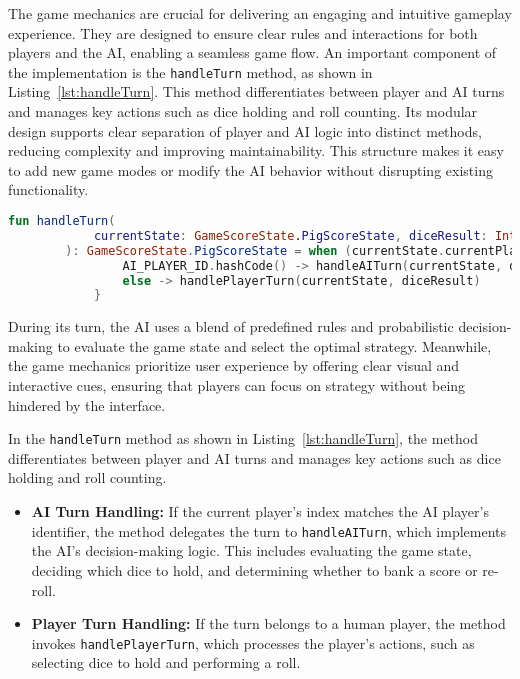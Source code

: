 The game mechanics are crucial for delivering an engaging and intuitive gameplay experience. They are designed to ensure clear rules and interactions for both players and the AI, enabling a seamless game flow.
An important component of the implementation is the \texttt{handleTurn} method, as shown in Listing~\ref{lst:handleTurn}. This method differentiates between player and AI turns and manages key actions such as dice holding and roll counting. Its modular design supports clear separation of player and AI logic into distinct methods, reducing complexity and improving maintainability. This structure makes it easy to add new game modes or modify the AI behavior without disrupting existing functionality.

\begin{lstlisting}[language=Kotlin, caption={handleTurn Function}, label=lst:handleTurn]
    fun handleTurn(
            currentState: GameScoreState.PigScoreState, diceResult: Int? = null
        ): GameScoreState.PigScoreState = when (currentState.currentPlayerIndex) {
                AI_PLAYER_ID.hashCode() -> handleAITurn(currentState, diceResult)
                else -> handlePlayerTurn(currentState, diceResult)
            }
\end{lstlisting}

During its turn, the AI uses a blend of predefined rules and probabilistic decision-making to evaluate the game state and select the optimal strategy. Meanwhile, the game mechanics prioritize user experience by offering clear visual and interactive cues, ensuring that players can focus on strategy without being hindered by the interface.

In the \texttt{handleTurn} method as shown in Listing~\ref{lst:handleTurn}, the method differentiates between player and AI turns and manages key actions such as dice holding and roll counting.
\begin{itemize}
    \item \textbf{AI Turn Handling:} If the current player's index matches the AI player's identifier, the method delegates the turn to \texttt{handleAITurn}, which implements the AI's decision-making logic. This includes evaluating the game state, deciding which dice to hold, and determining whether to bank a score or re-roll.
    \item \textbf{Player Turn Handling:} If the turn belongs to a human player, the method invokes \texttt{handlePlayerTurn}, which processes the player's actions, such as selecting dice to hold and performing a roll.
\end{itemize}

